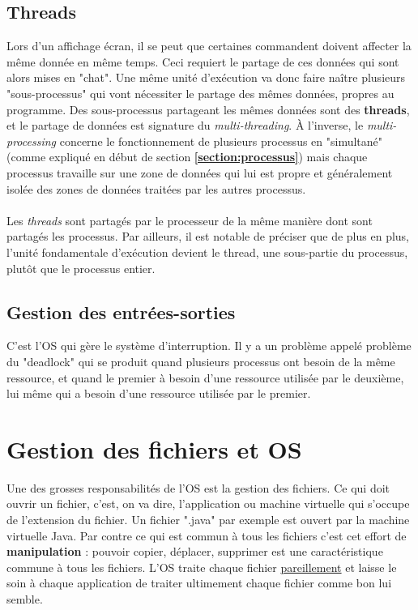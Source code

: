 \documentclass[12pt,a4paper]{report}
\begin{document}
\subsection{Threads}
Lors d'un affichage écran, il se peut que certaines commandent doivent affecter la même donnée en même temps. Ceci requiert le partage de ces données qui sont alors mises en "chat". Une même unité d'exécution va donc faire naître plusieurs "sous-processus" qui vont nécessiter le partage des mêmes données, propres au programme. Des sous-processus partageant les mêmes données sont des \textbf{threads}, et le partage de données est signature du \textit{multi-threading}. À l'inverse, le \textit{multi-processing} concerne le fonctionnement de plusieurs processus en "simultané" (comme expliqué en début de section \textbf{\ref{section:processus}}) mais chaque processus travaille sur une zone de données qui lui est propre et généralement isolée des zones de données traitées par les autres processus.\\
\\
Les \textit{threads} sont partagés par le processeur de la même manière dont sont partagés les processus. Par ailleurs, il est notable de préciser que de plus en plus, l'unité fondamentale d'exécution devient le thread, une sous-partie du processus, plutôt que le processus entier.
\subsection{Gestion des entrées-sorties}
C'est l'OS qui gère le système d'interruption. Il y a un problème appelé problème du "deadlock" qui se produit quand plusieurs processus ont besoin de la même ressource, et quand le premier à besoin d'une ressource utilisée par le deuxième, lui même qui a besoin d'une ressource utilisée par le premier.
\section{Gestion des fichiers et OS}
Une des grosses responsabilités de l'OS est la gestion des fichiers. Ce qui doit ouvrir un fichier, c'est, on va dire, l'application ou machine virtuelle qui s'occupe de l'extension du fichier. Un fichier ".java" par exemple est ouvert par la machine virtuelle Java. Par contre ce qui est commun à tous les fichiers c'est cet effort de \textbf{manipulation} : pouvoir copier, déplacer, supprimer est une caractéristique commune à tous les fichiers. L'OS traite chaque fichier \underline{pareillement} et laisse le soin à chaque application de traiter ultimement chaque fichier comme bon lui semble.
\end{document}
